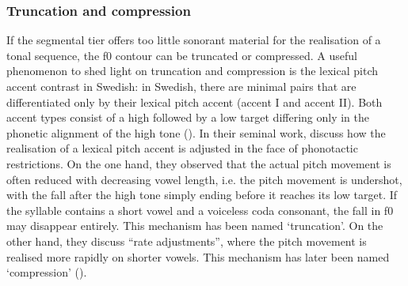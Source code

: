 \subsubsection{Truncation and compression}
If the segmental tier offers too little sonorant material for the realisation of a tonal sequence, the f0 contour can be truncated or compressed. A useful phenomenon to shed light on truncation and compression is the lexical pitch accent contrast in Swedish: in Swedish, there are minimal pairs that are differentiated only by their lexical pitch accent (accent I and accent II). Both accent types consist of a high followed by a low target differing only in the phonetic alignment of the high tone (\citealt{Bruce1977}). In their seminal work, \citet{EriksonAlstermark1972} discuss how the realisation of a lexical pitch accent is adjusted in the face of phonotactic restrictions. On the one hand, they observed that the actual pitch movement is often reduced with decreasing vowel length, i.e. the pitch movement is undershot, with the fall after the high tone simply ending before it reaches its low target. If the syllable contains a short vowel and a voiceless coda consonant, the fall in f0 may disappear entirely. This mechanism has been named ‘truncation’. On the other hand, they discuss “rate adjustments”, where the pitch movement is realised more rapidly on shorter vowels. This mechanism has later been named ‘compression’ (\citealt{BannertBredwad1975}). 

